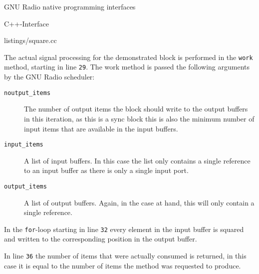 \begin{subchapter}{GNU Radio native programming interfaces}
\begin{subsubchapter}{C++-Interface}
    
                    {listings/square.cc}

    The actual signal processing for the demonstrated block
    is performed in the \texttt{work} method, starting in line
    \texttt{29}. The work method is passed the following arguments
    by the GNU Radio scheduler:

    \begin{description}
      \item[\texttt{noutput\_items}]
        The number of output items the block should write to the output
        buffers in this iteration, as this is a sync block this is also
        the minimum number of input items that are available in the input buffers.

      \item[\texttt{input\_items}]
        A list of input buffers. In this case the list only contains
        a single reference to an input buffer as there is only a
        single input port.

      \item[\texttt{output\_items}]
        A list of output buffers. Again, in the case at hand,
        this will only contain a single reference.
    \end{description}
  \end{subsubchapter}

  In the \texttt{for}-loop starting in line \texttt{32}
  every element in the input buffer is squared and written to
  the corresponding position in the output buffer.

  In line \texttt{36} the number of items that were actually consumed
  is returned, in this case it is equal to the number of items
  the method was requested to produce.
\end{subchapter}

